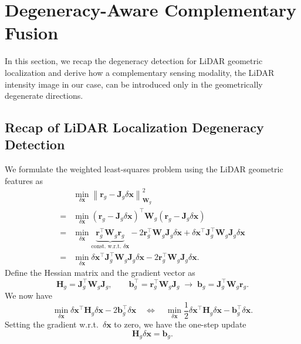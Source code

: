 \section{Degeneracy-Aware Complementary Fusion}
In this section, we recap the degeneracy detection for LiDAR geometric localization and derive how a complementary sensing modality, the LiDAR intensity image in our case, can be introduced only in the geometrically degenerate directions.

\subsection{Recap of LiDAR Localization Degeneracy Detection}
We formulate the weighted least-squares problem using the LiDAR geometric features as
\begin{equation}
\begin{split}
    &\min_{\delta\mathbf{x}} \left\|\mathbf{r}_g - \mathbf{J}_g\delta\mathbf{x}\right\|_{\mathbf{W}_g}^2 \\
    =& \min_{\delta\mathbf{x}} \left(\mathbf{r}_g - \mathbf{J}_g\delta\mathbf{x}\right)^{\top}\mathbf{W}_g\left(\mathbf{r}_g - \mathbf{J}_g\delta\mathbf{x}\right) \\
    =& \min_{\delta\mathbf{x}} \underbrace{\mathbf{r}_g^{\top}\mathbf{W}_g\mathbf{r}_g}_{\text{const. w.r.t. } \delta\mathbf{x}} - 2\mathbf{r}_g^{\top}\mathbf{W}_g\mathbf{J}_g\delta\mathbf{x} + \delta\mathbf{x}^{\top}\mathbf{J}_g^{\top}\mathbf{W}_g\mathbf{J}_g\delta\mathbf{x} \\
    =& \min_{\delta\mathbf{x}} \delta\mathbf{x}^{\top}\mathbf{J}_g^{\top}\mathbf{W}_g\mathbf{J}_g\delta\mathbf{x} - 2\mathbf{r}_g^{\top}\mathbf{W}_g\mathbf{J}_g\delta\mathbf{x}.
\end{split}
\end{equation}
Define the Hessian matrix and the gradient vector as
\begin{equation}
    \mathbf{H}_g = \mathbf{J}_g^{\top}\mathbf{W}_g\mathbf{J}_g, \qquad
    \mathbf{b}_g^{\top} = \mathbf{r}_g^{\top}\mathbf{W}_g\mathbf{J}_g \;\rightarrow\; \mathbf{b}_g = \mathbf{J}_g^{\top}\mathbf{W}_g\mathbf{r}_g.
\end{equation}
We now have
\begin{equation}
    \min_{\delta\mathbf{x}} \delta\mathbf{x}^{\top}\mathbf{H}_g\delta\mathbf{x} - 2\mathbf{b}_g^{\top}\delta\mathbf{x}
    \quad\Leftrightarrow\quad
    \min_{\delta\mathbf{x}} \frac{1}{2}\delta\mathbf{x}^{\top}\mathbf{H}_g\delta\mathbf{x} - \mathbf{b}_g^{\top}\delta\mathbf{x}.
\end{equation}
Setting the gradient w.r.t.\ $\delta\mathbf{x}$ to zero, we have the one-step update
\begin{equation}
    \mathbf{H}_g\delta\mathbf{x} = \mathbf{b}_g.
\end{equation}

